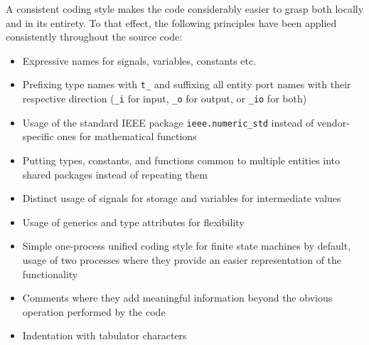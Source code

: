 \documentclass[a4paper, 11pt, oneside]{Thesis}  %
\begin{document}
A consistent coding style makes the code considerably easier to grasp both locally and in its entirety. To that effect, the following principles have been applied consistently throughout the source code:
\begin{itemize}
\item Expressive names for signals, variables, constants etc.
\item Prefixing type names with \texttt{t\_} and suffixing all entity port names with their respective direction (\texttt{\_i} for input, \texttt{\_o} for output, or \texttt{\_io} for both)
\item Usage of the standard IEEE package \texttt{ieee.numeric\_std} instead of vendor-specific ones for mathematical functions
\item Putting types, constants, and functions common to multiple entities into shared packages instead of repeating them
\item Distinct usage of signals for storage and variables for intermediate values
\item Usage of generics and type attributes for flexibility
\item Simple one-process unified coding style for finite state machines by default, usage of two processes where they provide an easier representation of the functionality
\item Comments where they add meaningful information beyond the obvious operation performed by the code
\item Indentation with tabulator characters
\end{itemize}



\backmatter

\label{Bibliography}
\printbibliography
\end{document}
